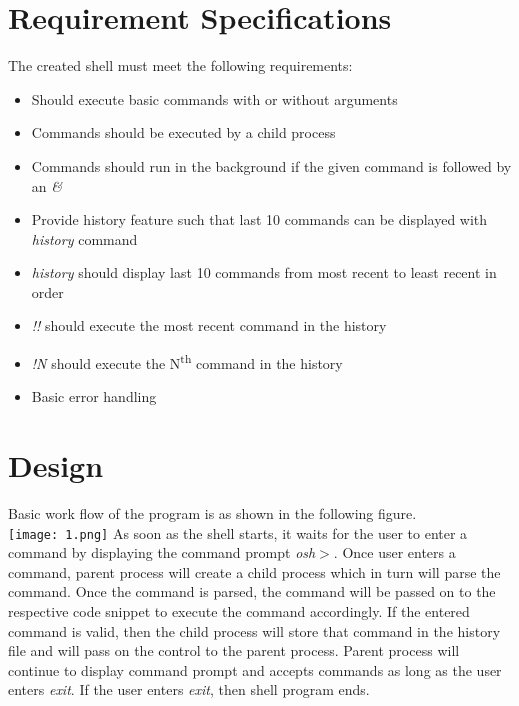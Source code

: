 \documentclass[12pt,twoside]{article}
\begin{document}
\section{Requirement Specifications}
The created shell must meet the following requirements:
\begin{itemize}
    \item Should execute basic commands with or without arguments
    \item Commands should be executed by a child process
    \item Commands should run in the background if the given command is followed by an \emph{\&}
    \item Provide history feature such that last 10 commands can be displayed with \emph{history} command
    \item \emph{history} should display last 10 commands from most recent to least recent in order
    \item \emph{!!} should execute the most recent command in the history
    \item \emph{!N} should execute the N\textsuperscript{th} command in the history
    \item Basic error handling
\end{itemize}


\section{Design}
Basic work flow of the program is as shown in the following figure. \\
\hfill \break
\texttt{[image: 1.png]}
\hfill \break
\hfill \break
As soon as the shell starts, it waits for the user to enter a command by displaying the command prompt \emph{osh$>$}. Once user enters a command, parent process will create a child process which in turn will parse the command. Once the command is parsed, the command will be passed on to the respective code snippet to execute the command accordingly. If the entered command is valid, then the child process will store that command in the history file and will pass on the control to the parent process. Parent process will continue to display command prompt and accepts commands as long as the user enters \emph{exit}. If the user enters \emph{exit}, then shell program ends. \\
\hfill \break
\pagebreak
\end{document}
